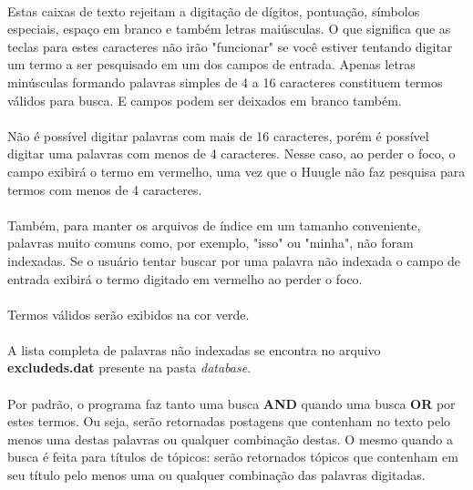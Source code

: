 \documentclass[a4paper,12pt,openany]{book}
\begin{document}
\paragraph{}
Estas caixas de texto rejeitam a digitação de dígitos, pontuação, símbolos especiais, espaço em branco e também letras maiúsculas. O que significa que as teclas para estes caracteres não irão "funcionar" se você estiver tentando digitar um termo a ser pesquisado em um dos campos de entrada. Apenas letras minúsculas formando palavras simples de 4 a 16 caracteres
 constituem termos válidos para busca. E campos podem ser deixados em branco também.
\paragraph{} 
Não é possível digitar palavras com mais de 16 caracteres, porém é possível digitar uma palavras com menos de 4 caracteres. Nesse caso, ao perder o foco, o campo exibirá o termo em vermelho, uma vez que o Huugle não faz pesquisa para termos com menos de 4 caracteres.
\paragraph{}
Também, para manter os arquivos de índice em um tamanho conveniente, palavras muito comuns como, por exemplo,  "isso" ou "minha", não foram indexadas. Se o usuário tentar buscar por uma palavra não indexada o campo de entrada exibirá o termo digitado em vermelho ao perder o foco.
\paragraph{} 
Termos válidos serão exibidos na cor verde.
\paragraph{}
A lista completa de palavras não indexadas se encontra no arquivo \textbf{excludeds.dat} presente na pasta \textit{database}.
\paragraph{}
Por padrão, o programa faz tanto uma busca \textbf{AND} quando uma busca \textbf{OR} por estes termos. Ou seja, serão retornadas postagens que contenham no texto pelo menos uma destas palavras ou qualquer combinação
destas. O mesmo quando a busca é feita para títulos de tópicos: serão retornados tópicos que contenham em seu título pelo menos uma ou qualquer combinação das palavras digitadas.
\end{document}
